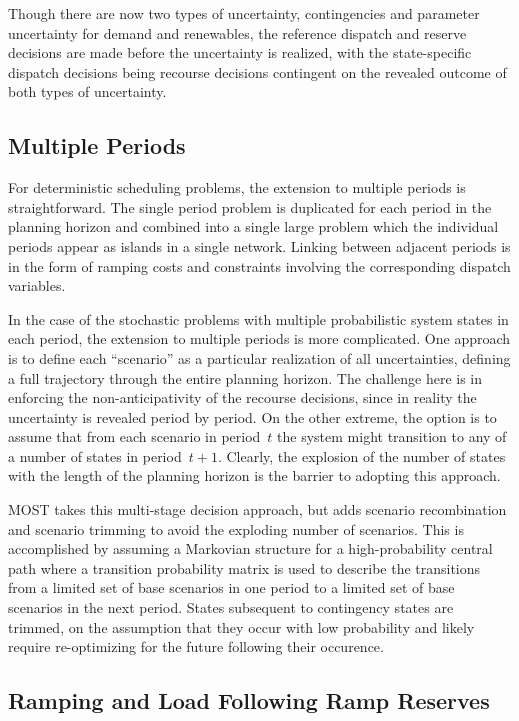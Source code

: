 \documentclass[12pt]{article}
\newcommand{\most}[0]{{MOST}}
\numberwithin{equation}{section}
\numberwithin{table}{section}
\numberwithin{figure}{section}
\begin{document}
Though there are now two types of uncertainty, contingencies and parameter uncertainty for demand and renewables, the reference dispatch and reserve decisions are made before the uncertainty is realized, with the state-specific dispatch decisions being recourse decisions contingent on the revealed outcome of both types of uncertainty.

\subsection{Multiple Periods}

For deterministic scheduling problems, the extension to multiple periods is straightforward. The single period problem is duplicated for each period in the planning horizon and combined into a single large problem which the individual periods appear as islands in a single network. Linking between adjacent periods is in the form of ramping costs and constraints involving the corresponding dispatch variables.

In the case of the stochastic problems with multiple probabilistic system states in each period, the extension to multiple periods is more complicated. One approach is to define each ``scenario'' as a particular realization of all uncertainties, defining a full trajectory through the entire planning horizon. The challenge here is in enforcing the non-anticipativity of the recourse decisions, since in reality the uncertainty is revealed period by period. On the other extreme, the option is to assume that from each scenario in period~$t$ the system might transition to any of a number of states in period~$t+1$. Clearly, the explosion of the number of states with the length of the planning horizon is the barrier to adopting this approach.

\most{} takes this multi-stage decision approach, but adds scenario recombination and scenario trimming to avoid the exploding number of scenarios. This is accomplished by assuming a Markovian structure for a high-probability central path where a transition probability matrix is used to describe the transitions from a limited set of base scenarios in one period to a limited set of base scenarios in the next period. States subsequent to contingency states are trimmed, on the assumption that they occur with low probability and likely require re-optimizing for the future following their occurence.

\subsection{Ramping and Load Following Ramp Reserves}
\end{document}

